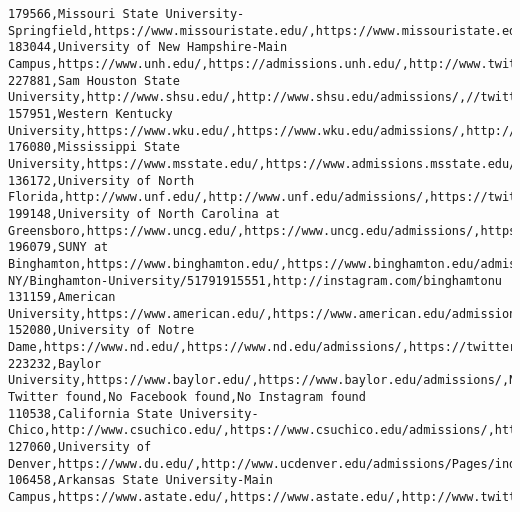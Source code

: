 \documentclass[11pt]{article}
\begin{document}
\begin{Verbatim}[commandchars=\\\{\}]
179566,Missouri State University-Springfield,https://www.missouristate.edu/,https://www.missouristate.edu/admissions/,https://twitter.com/missouristate,https://www.facebook.com/missouristateu,https://instagram.com/missouristate
183044,University of New Hampshire-Main Campus,https://www.unh.edu/,https://admissions.unh.edu/,http://www.twitter.com/uofnh,https://www.facebook.com/universityofnewhampshire,http://www.instagram.com/uofnh
227881,Sam Houston State University,http://www.shsu.edu/,http://www.shsu.edu/admissions/,//twitter.com/samhoustonstate,//www.facebook.com/samhoustonstate,//instagram.com/samhoustonstate
157951,Western Kentucky University,https://www.wku.edu/,https://www.wku.edu/admissions/,http://twitter.com/wkualumni,http://www.facebook.com/WKUNews,http://www.instagram.com/wku
176080,Mississippi State University,https://www.msstate.edu/,https://www.admissions.msstate.edu/,http://www.twitter.com/msstate/,http://www.facebook.com/msstate/,https://instagram.com/msstate/
136172,University of North Florida,http://www.unf.edu/,http://www.unf.edu/admissions/,https://twitter.com/UofNorthFlorida,https://www.facebook.com/UofNorthFlorida,http://instagram.com/uofnorthflorida/
199148,University of North Carolina at Greensboro,https://www.uncg.edu/,https://www.uncg.edu/admissions/,https://twitter.com/UNCG,https://www.facebook.com/uncg1891/,https://www.instagram.com/uncg/
196079,SUNY at Binghamton,https://www.binghamton.edu/,https://www.binghamton.edu/admissions/index.html,http://twitter.com/binghamtonu,http://www.facebook.com/pages/Binghamton-NY/Binghamton-University/51791915551,http://instagram.com/binghamtonu
131159,American University,https://www.american.edu/,https://www.american.edu/admissions/,http://www.twitter.com/AmericanU,http://www.facebook.com/AmericanUniversity,http://instagram.com/americanuniversity
152080,University of Notre Dame,https://www.nd.edu/,https://www.nd.edu/admissions/,https://twitter.com/NotreDame/,https://www.facebook.com/notredame/,https://www.instagram.com/notredame/
223232,Baylor University,https://www.baylor.edu/,https://www.baylor.edu/admissions/,No Twitter found,No Facebook found,No Instagram found
110538,California State University-Chico,http://www.csuchico.edu/,https://www.csuchico.edu/admissions/,https://twitter.com/chicostate,https://www.facebook.com/CaliforniaStateUniversityChico,http://instagram.com/chicostate
127060,University of Denver,https://www.du.edu/,http://www.ucdenver.edu/admissions/Pages/index.aspx,http://www.twitter.com/uofdenver,http://www.facebook.com/uofdenver,http://www.instagram.com/uofdenver/
106458,Arkansas State University-Main Campus,https://www.astate.edu/,https://www.astate.edu/,http://www.twitter.com/ArkansasState,http://www.facebook.com/ArkansasState,http://instagram.com/arkansasstate

\end{Verbatim}
\end{document}
